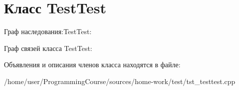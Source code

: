 \hypertarget{classTestTest}{\section{Класс Test\+Test}
\label{classTestTest}
}


Граф наследования\+:Test\+Test\+:


Граф связей класса Test\+Test\+:


Объявления и описания членов класса находятся в файле\+:\begin{DoxyCompactItemize}
\item 
/home/user/\+Programming\+Course/sources/home-\/work/test/tst\+\_\+testtest.\+cpp\end{DoxyCompactItemize}
